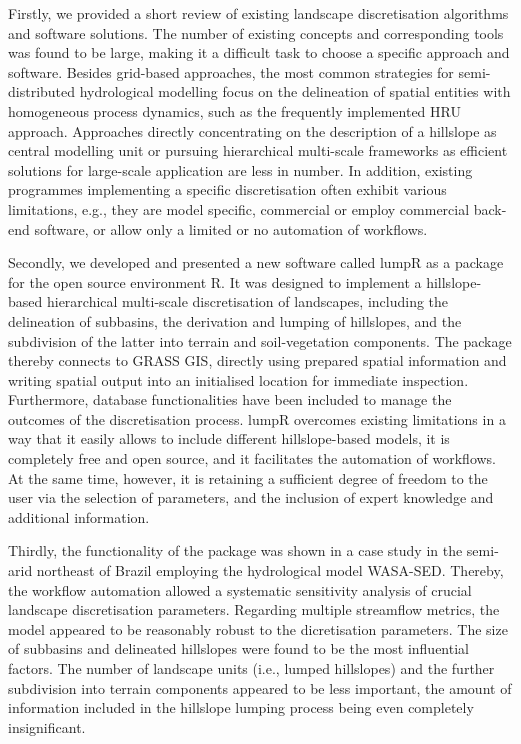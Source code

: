 Firstly, we provided a short review of existing landscape discretisation algorithms and software solutions.
The number of existing concepts and corresponding tools was found to be large, making it a difficult task to choose a specific approach and software.
Besides grid-based approaches, the most common strategies for semi-distributed hydrological modelling focus on the delineation of spatial entities with homogeneous process dynamics, such as the frequently implemented HRU approach.
Approaches directly concentrating on the description of a hillslope as central modelling unit or pursuing hierarchical multi-scale frameworks as efficient solutions for large-scale application are less in number.
In addition, existing programmes implementing a specific discretisation often exhibit various limitations, e.g., they are model specific, commercial or employ commercial back-end software, or allow only a limited or no automation of workflows.

Secondly, we developed and presented a new software called lumpR as a package for the open source environment R.
It was designed to implement a hillslope-based hierarchical multi-scale discretisation of landscapes, including the delineation of subbasins, the derivation and lumping of hillslopes, and the subdivision of the latter into terrain and soil-vegetation components.
The package thereby connects to GRASS GIS, directly using prepared spatial information and writing spatial output into an initialised location for immediate inspection.
Furthermore, database functionalities have been included to manage the outcomes of the discretisation process.
lumpR overcomes existing limitations in a way that it easily allows to include different hillslope-based models, it is completely free and open source, and it facilitates the automation of workflows.
At the same time, however, it is retaining a sufficient degree of freedom to the user via the selection of parameters, and the inclusion of expert knowledge and additional information.

Thirdly, the functionality of the package was shown in a case study in the semi-arid northeast of Brazil employing the hydrological model WASA-SED.
Thereby, the workflow automation allowed a systematic sensitivity analysis of crucial landscape discretisation parameters.
Regarding multiple streamflow metrics, the model appeared to be reasonably robust to the dicretisation parameters. 
The size of subbasins and delineated hillslopes were found to be the most influential factors.
The number of landscape units (i.e., lumped hillslopes) and the further subdivision into terrain components appeared to be less important, the amount of information included in the hillslope lumping process being even completely insignificant.

